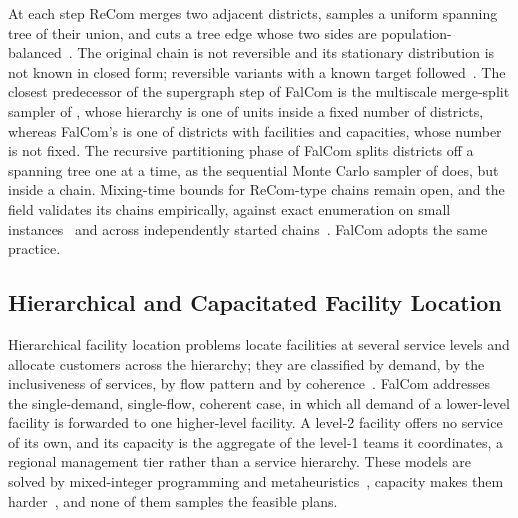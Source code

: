 \documentclass[11pt]{article}
\theoremstyle{definition}
\begin{document}
At each step ReCom merges two adjacent districts, samples a uniform spanning tree of their union, and cuts a tree edge whose two sides are population-balanced~\citep{deford2021recombination}. The original chain is not reversible and its stationary distribution is not known in closed form; reversible variants with a known target followed~\citep{carter2019mergesplit, autry2023forest, cannon2026spanning}. The closest predecessor of the supergraph step of FalCom is the multiscale merge-split sampler of \citet{autry2021multiscale}, whose hierarchy is one of units inside a fixed number of districts, whereas FalCom's is one of districts with facilities and capacities, whose number is not fixed. The recursive partitioning phase of FalCom splits districts off a spanning tree one at a time, as the sequential Monte Carlo sampler of \citet{mccartan2023sequential} does, but inside a chain. Mixing-time bounds for ReCom-type chains remain open, and the field validates its chains empirically, against exact enumeration on small instances~\citep{fifield2020essential, cannon2026spanning} and across independently started chains~\citep{deford2021recombination}. FalCom adopts the same practice.

\subsection{Hierarchical and Capacitated Facility Location}
\label{sec:hcfl}

Hierarchical facility location problems locate facilities at several service levels and allocate customers across the hierarchy; they are classified by demand, by the inclusiveness of services, by flow pattern and by coherence~\citep{csahin2007review, contreras2020hierarchical, NARULA198493}. FalCom addresses the single-demand, single-flow, coherent case, in which all demand of a lower-level facility is forwarded to one higher-level facility. A level-2 facility offers no service of its own, and its capacity is the aggregate of the level-1 teams it coordinates, a regional management tier rather than a service hierarchy. These models are solved by mixed-integer programming and metaheuristics~\citep{contreras2020hierarchical, darmian2021optimization, wang2025cluster}, capacity makes them harder~\citep{aardal1998reformulation}, and none of them samples the feasible plans.
\end{document}
